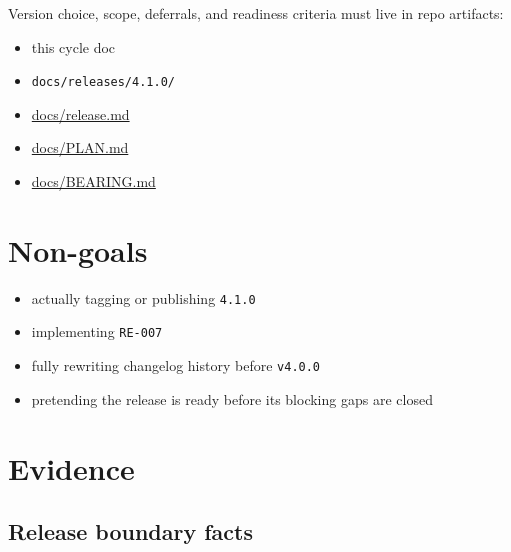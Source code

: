 Version choice, scope, deferrals, and readiness criteria must live in repo artifacts:

\begin{itemize}
\tightlist
\item
  this cycle doc
\item
  \texttt{d\allowbreak{}o\allowbreak{}c\allowbreak{}s\allowbreak{}/\allowbreak{}r\allowbreak{}e\allowbreak{}l\allowbreak{}e\allowbreak{}a\allowbreak{}s\allowbreak{}e\allowbreak{}s\allowbreak{}/\allowbreak{}4\allowbreak{}.\allowbreak{}1\allowbreak{}.\allowbreak{}0\allowbreak{}/}
\item
  \href{https://github.com/flyingrobots/bijou/blob/cbd70612140e7a450d764b3c7be1c6af878b99bc/docs/release.md}{docs/release.md}
\item
  \href{https://github.com/flyingrobots/bijou/blob/cbd70612140e7a450d764b3c7be1c6af878b99bc/docs/PLAN.md}{docs/PLAN.md}
\item
  \href{https://github.com/flyingrobots/bijou/blob/5b10cb89165b76673ffc60da59d7de5a531e55e9/docs/BEARING.md}{docs/BEARING.md}
\end{itemize}

\section{Non-goals}\label{record-202-non-goals}

\begin{itemize}
\tightlist
\item
  actually tagging or publishing \texttt{4\allowbreak{}.\allowbreak{}1\allowbreak{}.\allowbreak{}0}
\item
  implementing \texttt{R\allowbreak{}E\allowbreak{}-\allowbreak{}0\allowbreak{}0\allowbreak{}7}
\item
  fully rewriting changelog history before \texttt{v\allowbreak{}4\allowbreak{}.\allowbreak{}0\allowbreak{}.\allowbreak{}0}
\item
  pretending the release is ready before its blocking gaps are closed
\end{itemize}

\section{Evidence}\label{record-202-evidence}

\subsection{Release boundary facts}\label{record-202-release-boundary-facts}


